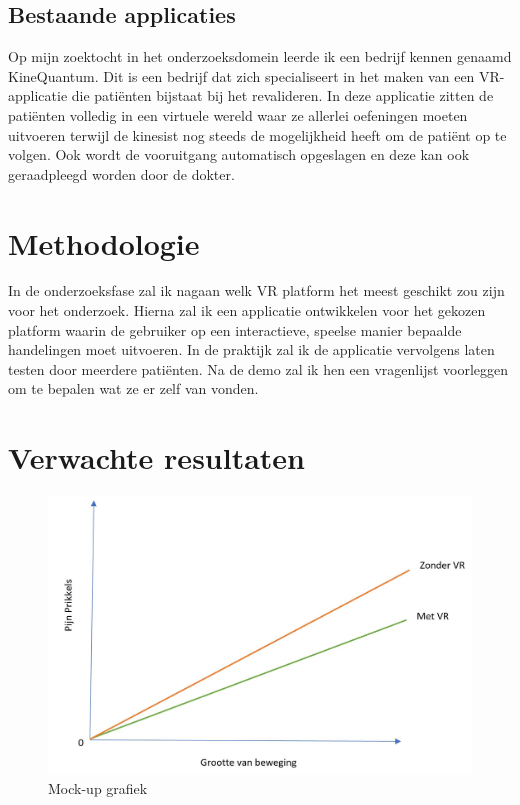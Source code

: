 \subsection{Bestaande applicaties}
Op mijn zoektocht in het onderzoeksdomein leerde ik een bedrijf kennen genaamd KineQuantum. Dit is een bedrijf dat zich specialiseert in het maken van een VR-applicatie die patiënten bijstaat bij het revalideren. In deze applicatie zitten de patiënten volledig in een virtuele wereld waar ze allerlei oefeningen moeten uitvoeren terwijl de kinesist nog steeds de mogelijkheid heeft om de patiënt op te volgen. Ook wordt de vooruitgang automatisch opgeslagen en deze kan ook geraadpleegd worden door de dokter.
\section{Methodologie}
\label{sec:methodologie}

In de onderzoeksfase zal ik nagaan welk VR platform het meest geschikt zou zijn voor het onderzoek. Hierna zal ik een applicatie ontwikkelen voor het gekozen platform waarin de gebruiker op een interactieve, speelse manier bepaalde handelingen moet uitvoeren. In de praktijk zal ik de applicatie vervolgens laten testen door meerdere patiënten. Na de demo zal ik hen een vragenlijst voorleggen om te bepalen wat ze er zelf van vonden.


\newpage
\section{Verwachte resultaten}
\label{sec:verwachte_resultaten}

\begin{figure}[h]
    \centering
    \includegraphics[scale=0.5]{mockupGraph.JPG}
    \caption{Mock-up grafiek}
    \label{graph}
\end{figure}

